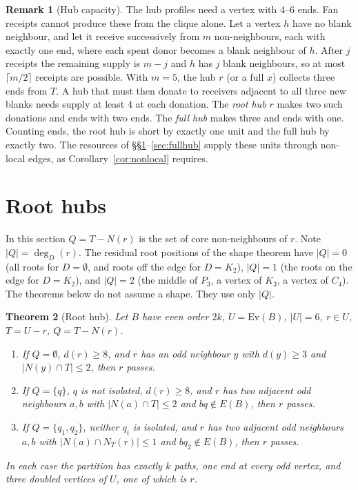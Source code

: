 \documentclass[11pt]{amsart}
\newtheorem{theorem}{Theorem}[section]
\theoremstyle{definition}
\newtheorem{remark}[theorem]{Remark}
\newcommand{\Ev}{\mathrm{Ev}}
\begin{document}
\begin{remark}[Hub capacity]\label{rem:capacity}
The hub profiles need a vertex with $4$--$6$ ends. Fan receipts cannot produce these from the
clique alone. Let a vertex $h$ have no blank neighbour, and let it receive successively from $m$
non-neighbours, each with exactly one end, where each spent donor becomes a blank neighbour of
$h$. After $j$ receipts the remaining supply is $m-j$ and $h$ has $j$ blank neighbours, so at most
$\lceil m/2\rceil$ receipts are possible. With $m=5$, the hub $r$ (or a full $x$) collects three
ends from $T$. A hub that must then donate to receivers adjacent to all three new blanks needs
supply at least $4$ at each donation. The \emph{root hub} $r$ makes two such donations and ends
with two ends. The \emph{full hub} makes three and ends with one. Counting ends, the root hub is
short by exactly one unit and the full hub by exactly two. The resources of
\S\S\ref{sec:roothub}--\ref{sec:fullhub} supply these units through non-local edges, as
Corollary~\ref{cor:nonlocal} requires.
\end{remark}

\section{Root hubs}\label{sec:roothub}

In this section $Q=T-N(r)$ is the set of core non-neighbours of $r$. Note $|Q|=\deg_D(r)$. The
residual root positions of the shape theorem have $|Q|=0$ (all roots for $D=\emptyset$, and roots
off the edge for $D=K_2$), $|Q|=1$ (the roots on the edge for $D=K_2$), and $|Q|=2$ (the middle of
$P_3$, a vertex of $K_3$, a vertex of $C_4$). The theorems below do not assume a shape. They use
only $|Q|$.

\begin{theorem}[Root hub]\label{thm:roothub}
Let $B$ have even order $2k$, $U=\Ev(B)$, $|U|=6$, $r\in U$, $T=U-r$, $Q=T-N(r)$.
\begin{enumerate}[label=(\roman*)]
\item If $Q=\emptyset$, $d(r)\ge8$, and $r$ has an odd neighbour $y$ with $d(y)\ge3$ and
$|N(y)\cap T|\le2$, then $r$ passes.
\item If $Q=\{q\}$, $q$ is not isolated, $d(r)\ge8$, and $r$ has two adjacent odd neighbours $a,b$ with
$|N(a)\cap T|\le2$ and $bq\notin E(B)$, then $r$ passes.
\item If $Q=\{q_1,q_2\}$, neither $q_i$ is isolated, and $r$ has two adjacent odd neighbours $a,b$ with
$|N(a)\cap N_T(r)|\le1$ and $bq_2\notin E(B)$, then $r$ passes.
\end{enumerate}
In each case the partition has exactly $k$ paths, one end at every odd vertex, and three doubled
vertices of $U$, one of which is $r$.
\end{theorem}
\end{document}
